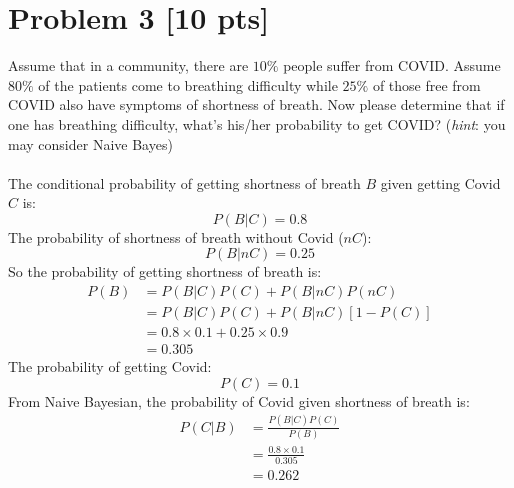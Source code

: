 \documentclass[11pt]{article}
\begin{document}
\section*{Problem 3 [10 pts]}
Assume that in a community, there are $10\%$ people suffer from COVID. Assume $80\%$ of the patients come to breathing difficulty while $25\%$ of those free from COVID also have symptoms of shortness of breath. Now please determine that if one has breathing difficulty, what's his/her probability to get COVID? (\textit{hint}: you may consider Naive Bayes)\\\\
The conditional probability of getting shortness of breath $B$ given getting Covid $C$ is:
\begin{equation}
	P(B|C) = 0.8
\end{equation} 
The probability of shortness of breath without Covid ($nC$):
\begin{equation}
	P(B|nC)=0.25
\end{equation}
So the probability of getting shortness of breath is:
\begin{equation}
	\begin{aligned}
		P(B)&=P(B|C)P(C)+P(B|nC)P(nC)\\
		&=P(B|C)P(C)+P(B|nC)[1-P(C)]\\
		&=0.8\times 0.1 + 0.25\times 0.9\\
		&=0.305
	\end{aligned}
\end{equation}
The probability of getting Covid:
\begin{equation}
	P(C)=0.1
\end{equation}
From Naive Bayesian, the probability of Covid given shortness of breath is:
\begin{equation}
	\begin{aligned}
		P(C|B)&=\frac{P(B|C)P(C)}{P(B)}\\
		&=\frac{0.8\times 0.1}{0.305}\\
		&=0.262
	\end{aligned}
\end{equation}


\newpage
\end{document}
